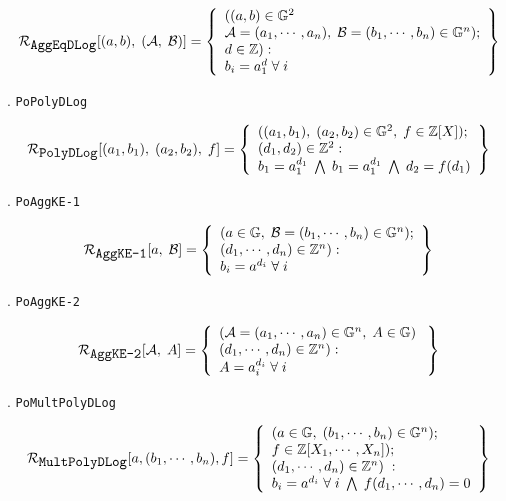 \documentclass[11pt, lettersize, notitlepage, leqno, footskip=0.6cm]{article}
\newcommand{\bz}{\mathbb Z}
\newcommand{\mc}{\mathcal}
\newcommand{\mb}{\mathbb}
\newcommand{\noin}{\noindent}
\numberwithin{equation}{section}
\begin{document}
{\[
  \mc{R}_{{\protect\verb|AggEqDLog|}}[(a, b),\;(\mc{A},\;\mc{B})] = \left\{\begin{array}{l}
  	((a, b)\in\mb{G}^2\\
    \mc{A} = (a_1, \cdots, a_n),\;\mc{B} = (b_1,\cdots, b_n)\in\mb{G}^n);\\
    d\in\mb{Z}): \\
    b_i = a_1^{d} \;\forall\;i
  \end{array}\right\}
\]
 

\noin 3. \verb|PoPolyDLog| \vspace{-0.3cm}

\[
  \mc{R}_{{\protect\verb|PolyDLog|}}[(a_1, b_1),\;(a_2,b_2),\;f] = \left\{\begin{array}{l}
    ((a_1, b_1), \; (a_2,b_2)\in\mb{G}^2,\;f\in\bz[X]);\\
    (d_1, d_2)\in\mb{Z}^2: \\
    b_1 = a_1^{d_1}\; \bigwedge\; b_1 = a_1^{d_1}\; \bigwedge \;d_2 = f(d_1)
  \end{array}\right\}
\]

\noin 4. \verb|PoAggKE-1| \vspace{-0.3cm}

\[
  \mc{R}_{{\protect\verb|AggKE-1|}}[a,\; \mc{B}] = \left\{\begin{array}{l}
    (a\in\mb{G},\; \mc{B} = (b_1,\cdots, b_n)\in\mb{G}^n);\\ 
    (d_1,\cdots,d_n)\in\bz^n):  \\
    b_i = a^{d_i}\;\forall\; i
  \end{array}\right\}
\]

\noin 5. \verb|PoAggKE-2| \vspace{-0.3cm}

\[
  \mc{R}_{{\protect\verb|AggKE-2|}}[\mc{A},\;A] = \left\{\begin{array}{l}
    (\mc{A} = (a_1,\cdots, a_n)\in \mb{G}^n,\; A\in\mb{G})\;\\ 
    (d_1,\cdots,d_n)\in\bz^n) :  \\
     A = a_i^{d_i}\;\forall\; i
  \end{array}\right\}
\]

\noin 6. \verb|PoMultPolyDLog| \vspace{-0.3cm}

\[
  \mc{R}_{{\protect\verb|MultPolyDLog|}}[a, (b_1,\cdots, b_n), f] = \left\{\begin{array}{l}
    (a\in\mb{G},\; (b_1,\cdots, b_n)\in\mb{G}^n);\\
    f\in\bz[X_1,\cdots,X_n]);\\ 
    (d_1,\cdots,d_n)\in \bz^n)\;: \\
    b_i = a^{d_i}\;\forall\; i\;\bigwedge \;   f(d_1,\cdots,d_n) = 0 
  \end{array}\right\}
\]

}
\end{document}
